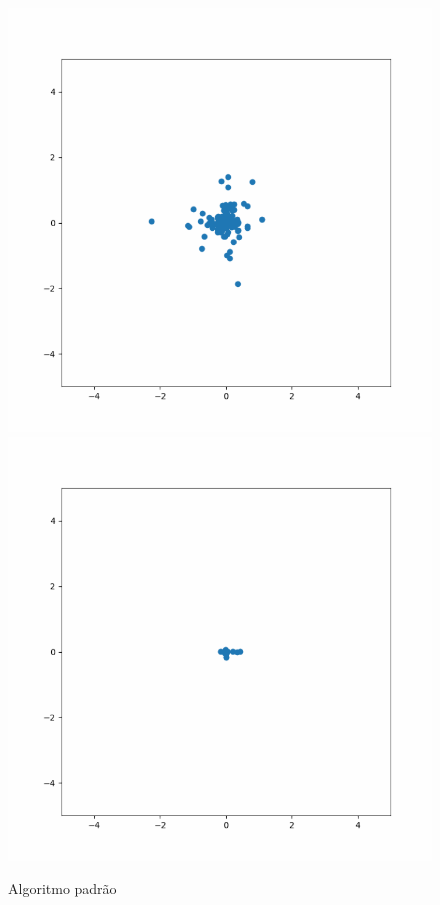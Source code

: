 \documentclass[conference]{IEEEtran}
\begin{document}
\begin{figure}[htbp]
\begin{center}
        \includegraphics[scale=0.3]{imagens-pso/particle-swarm-optimization-03.png}
        \includegraphics[scale=0.3]{imagens-pso/particle-swarm-optimization-04.png}
    \caption{Algoritmo padrão} \label{gdimotes}
    \end{center}
    \end{figure}
\end{document}

